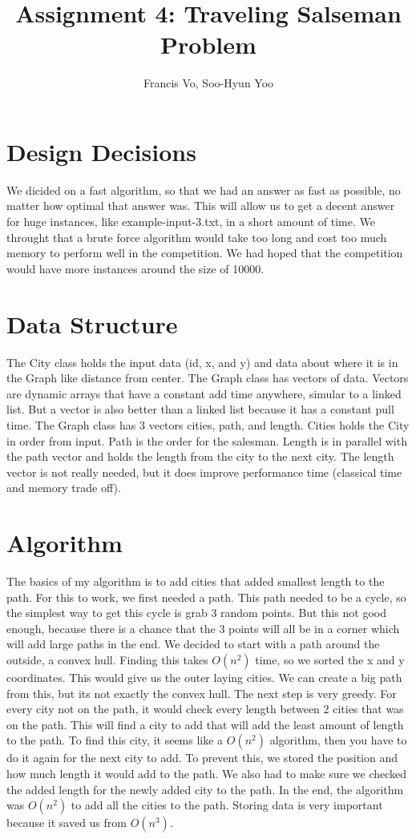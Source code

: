 \documentclass[letterpaper,10pt]{article}
\title{Assignment 4: Traveling Salseman Problem}
\author{Francis Vo, Soo-Hyun Yoo}
\begin{document}
	\maketitle

    	\section{Design Decisions}
        	We dicided on a fast algorithm, so that we had an answer as fast as possible, no matter how optimal that answer was.  This will allow us to get a decent answer for huge instances, like example-input-3.txt, in a short amount of time.  We throught that a brute force algorithm would take too long and cost too much memory to perform well in the competition.  We had hoped that the competition would have more instances around the size of 10000.

	\section{Data Structure}
		The City class holds the input data (id, x, and y) and data about where it is in the Graph like distance from center. The Graph class has vectors of data. Vectors are dynamic arrays that have a constant add time anywhere, simular to a linked list.  But a vector is also better than a linked list because it has a constant pull time.  The Graph class has 3 vectors cities, path, and length.  Cities holds the City in order from input.  Path is the order for the salesman.  Length is in parallel with the path vector and holds the length from the city to the next city. The length vector is not really needed, but it does improve performance time (classical time and memory trade off). 

	\section{Algorithm}
		The basics of my algorithm is to add cities that added smallest length to the path.  For this to work, we first needed a path.  This path needed to be a cycle, so the simplest way to get this cycle is grab 3 random points.  But this not good enough, because there is a chance that the 3 points will all be in a corner which will add large paths in the end.  We decided to start with a path around the outside, a convex hull.  Finding this takes $O(n^2)$ time, so we sorted the x and y coordinates.  This would give us the outer laying cities. We can create a big path from this, but its not exactly the convex hull. The next step is very greedy. For every city not on the path, it would check every length between 2 cities that was on the path.  This will find a city to add that will add the least amount of length to the path.  To find this city, it seems like a $O(n^2)$ algorithm, then you have to do it again for the next city to add. To prevent this, we stored the position and how much length it would add to the path. We also had to make sure we checked the added length for the newly added city to the path.  In the end, the algorithm was $O(n^2)$ to add all the cities to the path.  Storing data is very important because it saved us from $O(n^3)$. 
\end{document}
